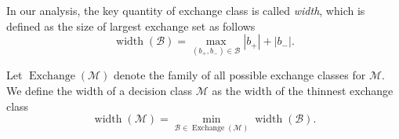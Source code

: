 \documentclass{article}
\newcommand{\wei}[1]{}
\newcommand{\wei}[1]{{\color{blue!50!black}  [\text{Wei:} #1]}}
\newcommand{\junk}[1]{}
\newcommand{\M}{\mathcal M}
\newcommand{\B}{\mathcal B}
\DeclareMathOperator{\rank}{width}
\DeclareMathOperator{\Exchange}{Exchange}
\begin{document}
In our analysis, the key quantity of exchange class is called \emph{width}, which is defined as the size of largest exchange set as follows
\begin{equation}
\label{eq:width}
\rank(\B) = \max_{(b_+,b_-) \in \B} |b_+|+|b_-|.
\end{equation}
\junk{
Intuitively, for any feasible sets $M$ and $M'$, there exists an exchange set $(b_+,b_-)\in \B$ belonging to the exchange class $\B$ which can be seen as an ``operation'' that transforms $M$ one step towards $M'$: this operation generates a new feasible set $M\oplus b$ by removing elements (including $e$) from $M$ and adding elements which belongs to $M'$.
One can chain these operations together: for any $M\not= M'$, there exists a sequence of exchange sets $b_1,\ldots, b_k$ of $\B$ such that $M'=M\oplus b_1 \oplus \ldots \oplus b_k$.
}
\junk{
We notice that an exchange class $\B$ for $\M$ can be ``redundant''. 
It may contains some unnecessary exchange set $b$, such that $M\oplus b \not\in \M$ for any $M \in \M$.
These redundant exchange sets do not affect our analysis.
But allowing them would simplify the construction and description of exchange classes for certain combinatorial problems.
}
Let $\Exchange(\M)$ denote the family of all possible exchange classes for $\M$.
We define the width of a decision class $\M$ as the width of the thinnest exchange class
\begin{equation}
\label{eq:width-class}
\rank(\M) = \min_{\B \in \Exchange(\M)} \rank(\B).
\end{equation}
\end{document}
